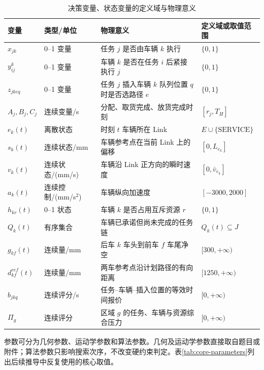 \documentclass[UTF8]{ctexart}
\begin{document}
\begin{table}[H]
\centering
\caption{决策变量、状态变量的定义域与物理意义}\label{tab:variables-domain}
\footnotesize
\renewcommand{\arraystretch}{1.16}
\begin{tabular}{p{2.2cm}p{2.0cm}p{5.1cm}p{3.3cm}}
\toprule[1pt]
变量 & 类型/单位 & 物理意义 & 定义域或取值范围\\ \midrule
$x_{jk}$ & 0--1 变量 & 任务 $j$ 是否由车辆 $k$ 执行 & $\{0,1\}$\\
$y_{ij}^{k}$ & 0--1 变量 & 车辆 $k$ 是否在任务 $i$ 后紧接执行 $j$ & $\{0,1\}$\\
$z_{jkeq}$ & 0--1 变量 & 任务 $j$ 插入车辆 $k$ 队列位置 $q$ 时是否选路径 $e$ & $\{0,1\}$\\
$A_j,B_j,C_j$ & 连续变量/s & 分配、取货完成、放货完成时刻 & $[r_j,T_H]$\\
$e_k(t)$ & 离散状态 & 时刻 $t$ 车辆所在 Link & $E\cup\{\mathrm{SERVICE}\}$\\
$s_k(t)$ & 连续状态/mm & 车辆参考点在当前 Link 上的偏移 & $[0,L_{e_k}]$\\
$v_k(t)$ & 连续状态/(mm/s) & 车辆沿 Link 正方向的瞬时速度 & $[0,\bar v_{e_k}]$\\
$a_k(t)$ & 连续控制/(mm/s$^2$) & 车辆纵向加速度 & $[-3000,2000]$\\
$h_{kr}(t)$ & 0--1 状态 & 车辆 $k$ 是否占用互斥资源 $r$ & $\{0,1\}$\\
$Q_k(t)$ & 有序集合 & 车辆已承诺但尚未完成的任务链 & $Q_k(t)\subseteq J$\\
$g_{kf}(t)$ & 连续量/mm & 后车 $k$ 车头到前车 $f$ 车尾净空 & $[300,+\infty)$\\
$d_{kf}^{ref}(t)$ & 连续量/mm & 两车参考点沿计划路径的有向距离 & $[1250,+\infty)$\\
$b_{jkq}$ & 连续评分/s & 任务--车辆--插入位置的等效时间报价 & $[0,+\infty)$\\
$\Pi_g$ & 连续评分 & 区域 $g$ 的任务、车辆与资源综合压力 & $[0,+\infty)$\\
\bottomrule[1pt]
\end{tabular}
\end{table}

参数可分为几何参数、运动学参数和算法参数。几何及运动学参数直接取自题目或附件；算法参数只影响搜索次序，不改变硬约束判定。表\ref{tab:core-parameters}列出后续推导中反复使用的核心取值。
\end{document}

